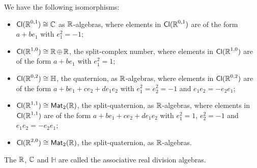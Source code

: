 We have the following isomorphisms:
\begin{itemize}
	\item $\Cl (\R^{0, 1}) \cong \C$ as $\R$-algebras, where elements in $\Cl(\R^{0, 1})$ are of the form $a + b e_1$ with $e_1^2 = -1$;
	\item $\Cl (\R^{1, 0}) \cong \R \oplus \R$, the split-complex number, where elements in $\Cl(\R^{1, 0})$ are of the form $a + b e_1$ with $e_1^2 = 1$;
	\item $\Cl (\R^{0, 2}) \cong \mathbb{H}$, the quaternion, as $\R$-algebras, where elements in $\Cl(\R^{0, 2})$ are of the form $a + b e_1 + c e_2 + d e_1 e_2$ with $e_1^2 = e_2^2 = -1$ and $e_1 e_2 = - e_2 e_1$;
	\item $\Cl (\R^{1, 1}) \cong \Mat_2(\R)$, the split-quaternion, as $\R$-algebras, where elements in $\Cl(\R^{1, 1})$ are of the form $a + b e_1 + c e_2 + d e_1 e_2$ with $e_1^2 = 1$, $e_2^2 = -1$ and $e_1 e_2 = - e_2 e_1$;
	\item $\Cl (\R^{2, 0}) \cong \Mat_2(\R)$, the split-quaternion, as $\R$-algebras.
\end{itemize}

The $\R$, $\C$ and $\mathbb{H}$ are called the associative real division algebras.
